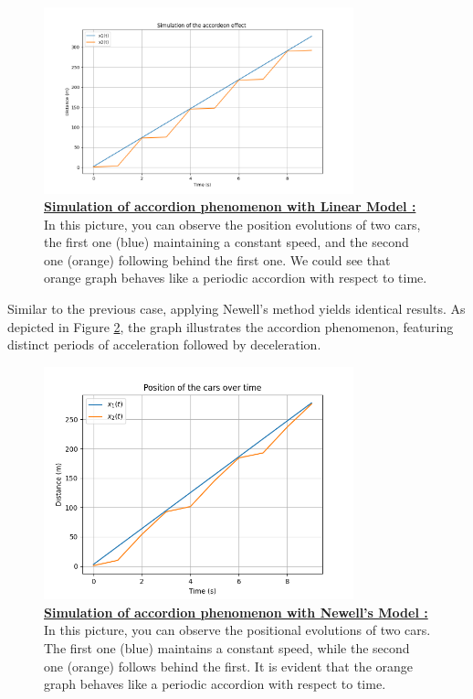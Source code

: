 \documentclass{article}
\begin{document}
		\begin{figure}[H]
			\centering
			\includegraphics[width=0.8\textwidth]{Accordeon1.png}
			\caption[Simulation of accordion phenomenon with Linear Model]{\textbf{\underline{Simulation of accordion phenomenon with Linear Model : }} In this picture, you can observe the position evolutions of two cars, the first one (blue) maintaining a constant speed, and the second one (orange) following behind the first one. We could see that orange graph behaves like a periodic accordion with respect to time.}
			\label{fig:Aco1}
		\end{figure}
		
		
		Similar to the previous case, applying Newell's method yields identical results. As depicted in Figure \ref{fig:1W2_ACCORD}, the graph illustrates the accordion phenomenon, featuring distinct periods of acceleration followed by deceleration.
		
		\begin{figure}[H]
			\centering
			\includegraphics[width=0.8\textwidth]{1W2_Accord.png}
			\caption[Simulation of accordion phenomenon with Newell's Model]{\textbf{\underline{Simulation of accordion phenomenon with Newell's Model : }} In this picture, you can observe the positional evolutions of two cars. The first one (blue) maintains a constant speed, while the second one (orange) follows behind the first. It is evident that the orange graph behaves like a periodic accordion with respect to time.}
			\label{fig:1W2_ACCORD}
		\end{figure}
		
\end{document}
